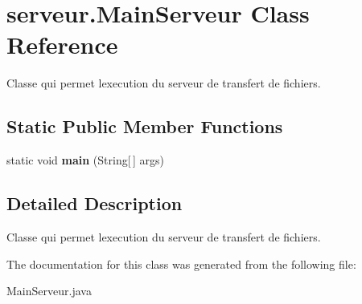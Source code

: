 \hypertarget{classserveur_1_1MainServeur}{}\section{serveur.\+Main\+Serveur Class Reference}
\label{classserveur_1_1MainServeur}


Classe qui permet l\textquotesingle{}execution du serveur de transfert de fichiers.  


\subsection*{Static Public Member Functions}
\begin{DoxyCompactItemize}
\item 
\mbox{\label{classserveur_1_1MainServeur_afe17c1452f1eaafbe93c797ff10bc824}} 
static void {\bfseries main} (String\mbox{[}$\,$\mbox{]} args)
\end{DoxyCompactItemize}


\subsection{Detailed Description}
Classe qui permet l\textquotesingle{}execution du serveur de transfert de fichiers. 

The documentation for this class was generated from the following file\+:\begin{DoxyCompactItemize}
\item 
Main\+Serveur.\+java\end{DoxyCompactItemize}
